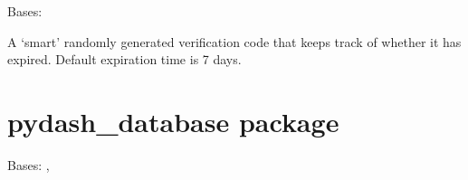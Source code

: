 \documentclass[letterpaper,10pt,english]{sphinxmanual}
\begin{document}
\begin{fulllineitems}
\label{\detokenize{pydash_app.user.verification_code:pydash_app.user.verification_code.VerificationCode}}
Bases: 

A ‘smart’ randomly generated verification code that keeps track of whether it has expired.
Default expiration time is 7 days.

\begin{fulllineitems}
\label{\detokenize{pydash_app.user.verification_code:pydash_app.user.verification_code.VerificationCode.is_expired}}
\end{fulllineitems}


\end{fulllineitems}



\section{pydash\_database package}
\label{\detokenize{pydash_database::doc}}\label{\detokenize{pydash_database:pydash-database-package}}\label{\detokenize{pydash_database:module-pydash_database}}

\begin{fulllineitems}
\label{\detokenize{pydash_database:pydash_database.MultiIndexedPersistentCollection}}
Bases: , 

\end{fulllineitems}


\begin{fulllineitems}
\label{\detokenize{pydash_database:pydash_database.database_connection}}
\end{fulllineitems}
\end{document}

